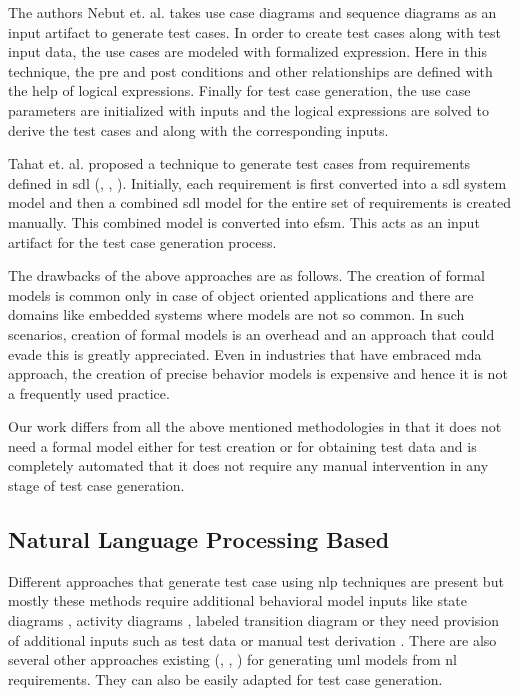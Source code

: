 The authors Nebut et. al. \cite{nebut2003requirements} takes use case diagrams and sequence diagrams as an input artifact to generate test cases. In order to create test cases along with test input data, the use cases are modeled with formalized expression. Here in this technique, the pre and post conditions and other relationships are defined with the help of logical expressions. Finally for test case generation, the use case parameters are initialized with inputs and the logical expressions are solved to derive the test cases and along with the corresponding inputs.

Tahat et. al. \cite{tahat2001requirement} proposed a technique to generate test cases from requirements defined in \gls{sdl} (\cite{algayres2012goal}, \cite{bochmann1997automating}, \cite{bromstrup1995tesdl}). Initially, each requirement is first converted into a \gls{sdl} system model and then a combined \gls{sdl} model for the entire set of requirements is created manually. This combined model is converted into \gls{efsm}. This acts as an input artifact for the test case generation process.

The drawbacks of the above approaches are as follows. The creation of formal models is common only in case of object oriented applications and there are domains like embedded systems where models are not so common. In such scenarios, creation of formal models is an overhead and an approach that could evade this is greatly appreciated. Even in industries that have embraced \gls{mda} approach, the creation of precise behavior models is expensive and hence it is not a frequently used practice.

Our work differs from all the above mentioned methodologies in that it does not need a formal model either for test creation or for obtaining test data and is completely automated that it does not require any manual intervention in any stage of test case generation.

\subsection{Natural Language Processing Based}
Different approaches that generate test case using \gls{nlp} techniques are present but mostly these methods require additional behavioral model inputs like state diagrams \cite{ryser1999scenario}, activity diagrams \cite{hasling2008model}, labeled transition diagram \cite{katara2006making} or they need provision of additional inputs such as test data or manual test derivation \cite{bertolino2003use}. There are also several other approaches existing (\cite{frohlich2000automated}, \cite{yue2010automated}, \cite{yue2013facilitating}) for generating \gls{uml} models from \gls{nl} requirements. They can also be easily adapted for test case generation.

